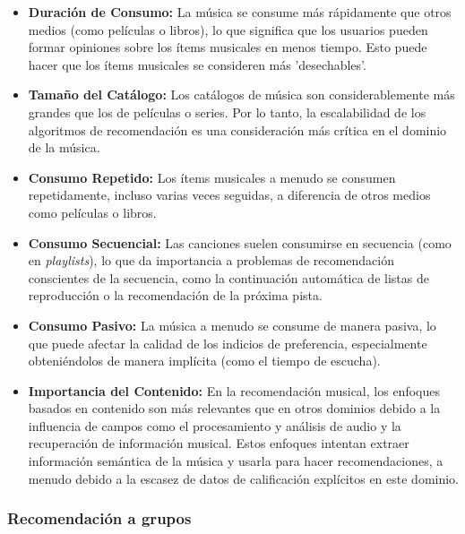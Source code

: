 \begin{itemize}
    \item \textbf{Duración de Consumo:} La música se consume más rápidamente que otros medios (como películas o libros), lo que significa que los usuarios
     pueden formar opiniones sobre los ítems musicales en menos tiempo. Esto puede hacer que los ítems musicales se consideren más 'desechables'.
    
    \item \textbf{Tamaño del Catálogo:} Los catálogos de música son considerablemente más grandes que los de películas o series. Por lo tanto, la 
    escalabilidad de los algoritmos de recomendación es una consideración más crítica en el dominio de la música.
    
    \item \textbf{Consumo Repetido:} Los ítems musicales a menudo se consumen repetidamente, incluso varias veces seguidas, a diferencia de otros medios
     como películas o libros.
    
    \item \textbf{Consumo Secuencial:} Las canciones suelen consumirse en secuencia (como en \textit{playlists}), lo que da importancia a problemas 
    de recomendación conscientes de la secuencia, como la continuación automática de listas de reproducción o la recomendación de la próxima pista.
    
    \item \textbf{Consumo Pasivo:} La música a menudo se consume de manera pasiva, lo que puede afectar la calidad de los indicios de preferencia,
    especialmente obteniéndolos de manera implícita (como el tiempo de escucha).
    
    \item \textbf{Importancia del Contenido:} En la recomendación musical, los enfoques basados en contenido son más relevantes que en otros dominios 
    debido a la influencia de campos como el procesamiento y análisis de audio y la recuperación de información musical. Estos enfoques intentan extraer 
    información semántica de la música y usarla para hacer recomendaciones, a menudo debido a la escasez de datos de calificación explícitos en este 
    dominio.
\end{itemize}


\subsubsection{Recomendación a grupos\label{SEC:RECOMENDACION_GRUPOS}}

